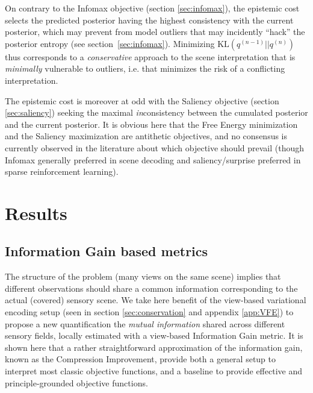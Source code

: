 \documentclass[12pt,twoside,openright]{article}
\begin{document}
On contrary to the Infomax objective (section \ref{sec:infomax}), the {\color{Purple} epistemic cost} selects the predicted posterior having the highest consistency with the current posterior, which may prevent from model outliers that may incidently ``hack'' the posterior entropy (see section~\ref{sec:infomax}).
Minimizing $\text{KL}(q^{(n-1)}||q^{(n)})$ thus corresponds to a \emph{conservative} approach to the scene interpretation
that is \emph{minimally} vulnerable to outliers, i.e. that minimizes the risk of a {\color{Purple} conflicting} interpretation. 

The {\color{Purple} epistemic cost} is moreover at odd with the Saliency objective (section \ref{sec:saliency}) seeking the maximal \emph{in}consistency between the cumulated posterior and the current posterior.
It is obvious here that the Free Energy minimization and the Saliency maximization are antithetic objectives, and no consensus is currently observed in the literature about which objective should prevail (though Infomax generally preferred in scene decoding and saliency/surprise preferred in sparse reinforcement learning).


\section{Results} \label{sec:results}



\subsection{Information Gain based metrics}
The structure of the problem (many views on the same scene) implies that {\color{Purple} different observations} should share a common information corresponding to the actual (covered) sensory scene.
We take here benefit of the {\color{Purple} view-based} variational encoding setup
{\color{Purple} (seen in section \ref{sec:conservation} and appendix \ref{app:VFE}) to propose a new quantification the \emph{mutual information} shared across different sensory fields, locally estimated with a view-based Information Gain metric. It is shown here that a rather straightforward approximation of the information gain,
	known as the Compression Improvement, provide both a general setup to interpret most classic objective functions, and a baseline to provide effective and  principle-grounded objective functions.}

\end{document}
